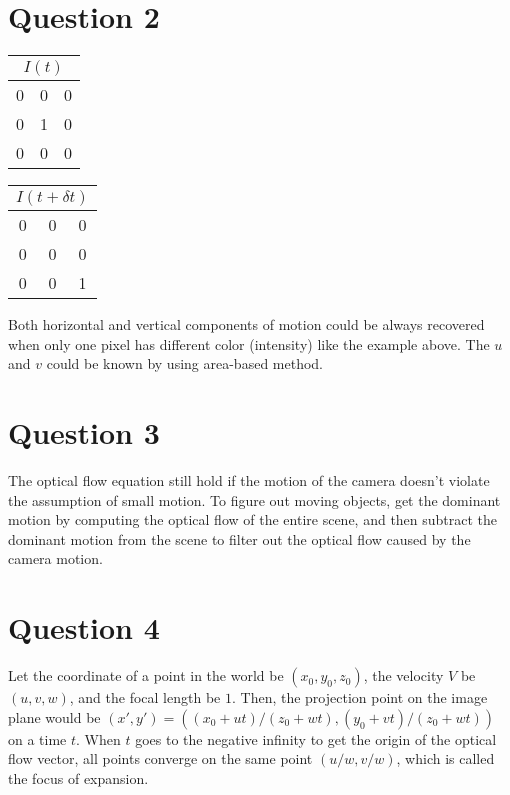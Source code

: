 \documentclass[a4paper,10pt]{article}
\begin{document}
\section*{Question 2}

\begin{table}[H]
\centering
\begin{tabular}{|c|c|c|}
\multicolumn{3}{c}{$I(t)$} \\
\hline
0 & 0 & 0 \\
\hline
0 & 1 & 0 \\
\hline
0 & 0 & 0 \\
\hline
\end{tabular}
\quad
\begin{tabular}{|c|c|c|}
\multicolumn{3}{c}{$I(t + \delta t)$} \\
\hline
0 & 0 & 0 \\
\hline
0 & 0 & 0 \\
\hline
0 & 0 & 1 \\
\hline
\end{tabular}
\end{table}

Both horizontal and vertical components of motion could be always recovered
when only one pixel has different color (intensity) like the example above.
The $u$ and $v$ could be known by using area-based method.

\section*{Question 3}

The optical flow equation still hold
if the motion of the camera doesn't violate the assumption of small motion.
To figure out moving objects,
get the dominant motion by computing the optical flow of the entire scene,
and then subtract the dominant motion from the scene
to filter out the optical flow caused by the camera motion.

\section*{Question 4}

Let the coordinate of a point in the world be $(x_0, y_0, z_0)$,
the velocity $V$ be $(u, v, w)$, and the focal length be $1$.
Then, the projection point on the image plane would be
$(x', y') = ((x_0 + ut) / (z_0 + wt), (y_0 + vt) / (z_0 + wt))$ on a time $t$.
When $t$ goes to the negative infinity to get the origin of the optical flow vector,
all points converge on the same point $(u/w, v/w)$, which is called the focus of expansion.
\end{document}
